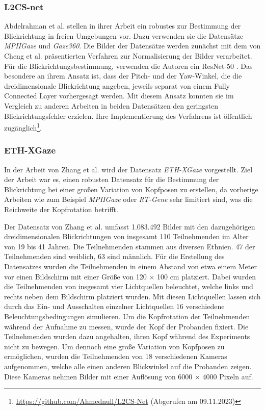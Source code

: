 \subsubsection{L2CS-net}\label{sec:related:gaze:appearance:l2cs}

Abdelrahman et al. stellen in ihrer Arbeit \cite{paper:l2csnet} ein robustes \cnn zur Bestimmung der Blickrichtung in freien Umgebungen vor. Dazu verwenden sie die Datensätze \textit{MPIIGaze} und \textit{Gaze360}. Die Bilder der Datensätze werden zunächst mit dem von Cheng et al. \cite{paper:basics:survey} präsentierten Verfahren zur Normalisierung der Bilder verarbeitet. Für die Blickrichtungsbestimmung, verwenden die Autoren ein ResNet-50 \cnn. Das besondere an ihrem Ansatz ist, dass der Pitch- und der Yaw-Winkel, die die dreidimensionale Blickrichtung angeben, jeweils separat von einem Fully Connected Layer vorhergesagt werden. Mit diesem Ansatz konnten sie im Vergleich zu anderen Arbeiten in beiden Datensätzen den geringsten Blickrichtungsfehler erzielen. Ihre Implementierung des Verfahrens ist öffentlich zugänglich\footnote{\url{https://github.com/Ahmednull/L2CS-Net} (Abgerufen am 09.11.2023)}.


\subsubsection{ETH-XGaze}\label{sec:related:eth-xgaze}\label{sec:related:gaze:appearance:eth-xgaze}

In der Arbeit von Zhang et al. \cite{paper:eth-xgaze} wird der Datensatz \textit{ETH-XGaze} vorgestellt. Ziel der Arbeit war es, einen robusten Datensatz für die Bestimmung der Blickrichtung bei einer großen Variation von Kopfposen zu erstellen, da vorherige Arbeiten wie zum Beispiel \textit{MPIIGaze} \cite{paper:mpiigaze} oder \textit{RT-Gene} \cite{paper:rt_gene} sehr limitiert sind, was die Reichweite der Kopfrotation betrifft.

Der Datensatz von Zhang et al. umfasst 1.083.492 Bilder mit den dazugehörigen dreidimensionalen Blickrichtungen von insgesamt 110 Teilnehmenden im Alter von 19 bis 41 Jahren. Die Teilnehmenden stammen aus diversen Ethnien. 47 der Teilnehmenden sind weiblich, 63 sind männlich. Für die Erstellung des Datensatzes wurden die Teilnehmenden in einem Abstand von etwa einem Meter vor einen Bildschirm mit einer Größe von 120 $\times$ 100 cm platziert. Dabei wurden die Teilnehmenden von insgesamt vier Lichtquellen beleuchtet, welche links und rechts neben dem Bildschirm platziert wurden. Mit diesen Lichtquellen lassen sich durch das Ein- und Ausschalten einzelner Lichtquellen 16 verschiedene Beleuchtungsbedingungen simulieren. Um die Kopfrotation der Teilnehmenden während der Aufnahme zu messen, wurde der Kopf der Probanden fixiert. Die Teilnehmenden wurden dazu angehalten, ihren Kopf während des Experiments nicht zu bewegen. Um dennoch eine große Variation von Kopfposen zu ermöglichen, wurden die Teilnehmenden von 18 verschiedenen Kameras aufgenommen, welche alle einen anderen Blickwinkel auf die Probanden zeigen. Diese Kameras nehmen Bilder mit einer Auflösung von 6000 $\times$ 4000 Pixeln auf. 

